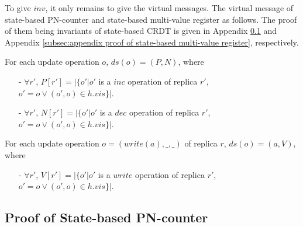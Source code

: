 {To give $\mathit{inv}$, it only remains to give the virtual messages. The virtual message of state-based PN-counter and state-based multi-value register as follows. The proof of them being invariants of state-based CRDT is given in Appendix \ref{subsec:appendix proof of state-based PN-counter} and Appendix \ref{subsec:appendix proof of state-based multi-value register}, respectively.

\begin{example}
\label{example:virtual messagess of state-based PN-counter}

For each update operation $o$, $\mathit{ds}(o) = (P,N)$, where

\begin{itemize}
\setlength{\itemsep}{0.5pt}
\item[-] $\forall r'$, $P[r'] = \vert \{ o' \vert o'$ is a $\mathit{inc}$ operation of replica $r'$, $o' = o \vee (o',o) \in h.\mathit{vis} \} \vert$.

\item[-] $\forall r'$, $N[r'] = \vert \{ o' \vert o'$ is a $\mathit{dec}$ operation of replica $r'$, $o' = o \vee (o',o) \in h.\mathit{vis} \} \vert$.
\end{itemize}
\end{example}

\begin{example}
\label{example:virtual messages of state-based multi-value register}

For each update operation $o = (\mathit{write}(a),\_,\_)$ of replica $r$, $\mathit{ds}(o) = (a,V)$, where

\begin{itemize}
\setlength{\itemsep}{0.5pt}
\item[-] $\forall r'$, $V[r'] = \vert \{ o' \vert o'$ is a $\mathit{write}$ operation of replica $r'$, $o' = o \vee (o',o) \in h.\mathit{vis} \} \vert$.
\end{itemize}
\end{example}















\subsection{Proof of State-based PN-counter}
\label{subsec:appendix proof of state-based PN-counter}

}

